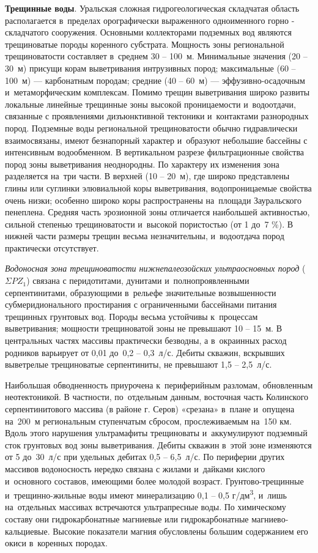 \textbf{Трещинные воды}. Уральская сложная гидрогеологическая складчатая область располагается в~пределах орографически выраженного одноименного горно - складчатого сооружения. Основными коллекторами подземных вод являются трещиноватые породы коренного субстрата. Мощность зоны региональной трещиноватости составляет в~среднем 30  --  100~м. Минимальные значения (20  --  30~м) присущи корам выветривания интрузивных пород; максимальные (60  --  100~м)  ---  карбонатным породам; средние (40  --  60~м)  ---  эффузивно-осадочным и~метаморфическим комплексам. Помимо трещин выветривания широко развиты локальные линейные трещинные зоны высокой проницаемости и~водоотдачи, связанные с проявлениями дизъюнктивной тектоники и~контактами разнородных пород. Подземные воды региональной трещиноватости обычно гидравлически взаимосвязаны, имеют безнапорный характер и~образуют небольшие бассейны с интенсивным водообменном. В вертикальном разрезе фильтрационные свойства пород зоны выветривания неоднородны. По характеру их изменения зона разделяется на~три части. В верхней (10  --  20~м), где широко представлены глины или суглинки элювиальной коры выветривания, водопроницаемые свойства очень низки; особенно широко коры распространены на~площади Зауральского пенеплена. Средняя часть эрозионной зоны отличается наибольшей активностью, сильной степенью трещиноватости и~высокой пористостью (от 1 до~7 \%). В нижней части размеры трещин весьма незначительны, и~водоотдача пород практически отсутствует.

\textit{Водоносная зона трещиноватости нижнепалеозойских ультраосновных пород} ($\Sigma PZ_1$)
связана с перидотитами, дунитами и~полнопроявленными серпентинитами, образующими в~рельефе значительные возвышенности субмеридионального простирания с ограниченными бассейнами питания трещинных грунтовых вод. Породы весьма устойчивы к~процессам выветривания; мощности трещиноватой зоны не превышают 10  --  15~м. В центральных частях массивы практически безводны, а в~окраинных расход родников варьирует от 0,01 до~0,2  --  0,3~л/с. Дебиты скважин, вскрывших выветрелые трещиноватые серпентиниты, не превышают 1,5 -- 2,5~л/с.

Наибольшая обводненность приурочена к~периферийным разломам, обновленным неотектоникой. В частности, по~отдельным данным, восточная часть Колинского серпентинитового массива (в районе г. Серов) «срезана» в~плане и~опущена на~200~м региональным ступенчатым сбросом, прослеживаемым на~150 км. Вдоль этого нарушения ультрамафиты трещиноваты и~аккумулируют подземный сток грунтовых вод зоны выветривания. Дебиты
скважин в~этой зоне изменяются от 5 до~30~л/с при удельных дебитах 0,5  --  6,5~л/с. По периферии других массивов водоносность нередко связана с жилами и~дайками кислого и~основного составов, имеющими более молодой возраст. Грунтово-трещинные и~трещинно-жильные воды имеют минерализацию 0,1 -- 0,5 г/дм\textsuperscript{3}, и~лишь на~отдельных массивах встречаются ультрапресные воды. По химическому составу они гидрокарбонатные магниевые или гидрокарбонатные магниево-кальциевые. Высокие показатели магния обусловлены большим содержанием его окиси в~коренных породах.

